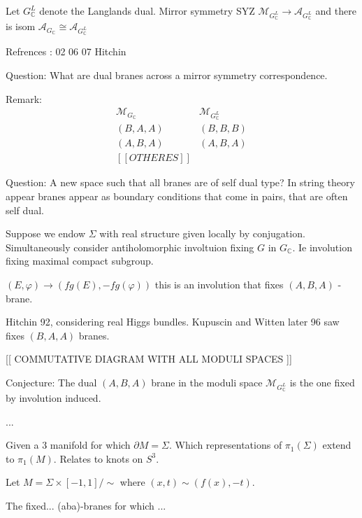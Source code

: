 Let $ G_\mathbb{C} ^L $ denote the Langlands dual. 
Mirror symmetry SYZ 
$\mathcal{M} _{G_\mathbb{C}  ^L } \rightarrow \mathcal{A} _{G_\mathbb{C}  ^L } $ 
and there is isom $\mathcal{A} _{G_\mathbb{C}  } \cong \mathcal{A} _{G_\mathbb{C}  ^L } $ 

Refrences : 
02 
06 
07 
Hitchin 

Question: 
What are dual branes across a mirror symmetry correspondence. 

Remark: 
\begin{align}
    \mathcal{M} _ {G_\mathbb{C} } & \mathcal{M} _ {G_\mathbb{C} ^L } \\
    (B, A, A) & (B,B,B) \\
    (A, B, A) & (A,B,A) \\
    [[ OTHERES ]] 
\end{align}

Question: A new space such that all branes are of self dual type?
In string theory appear branes appear as boundary conditions that come in pairs, 
that are often self dual. 

Suppose we endow $\Sigma $ with real structure given locally by conjugation.
Simultaneously consider antiholomorphic involtuion fixing $G$ in $G_\mathbb{C} $. 
Ie involution fixing maximal compact subgroup. 

$( E, \varphi) \rightarrow (fg(E), -fg(\varphi)) $ 
this is an involution that fixes $(A,B,A)$ -brane.

Hitchin 92, considering real Higgs bundles.
Kupuscin and Witten later 96 saw fixes $(B,A,A)$ branes. 


[[ COMMUTATIVE DIAGRAM WITH ALL MODULI SPACES  ]] 

Conjecture: 
The dual $(A,B,A)$ brane in the moduli space $ \mathcal{M}_{G_\mathbb{C}  ^L} $ 
is the one fixed by involution induced.

\begin{theorem}
...
\end{theorem}

Given a 3 manifold for which $ \partial M = \Sigma$. 
Which representations of $ \pi_1 ( \Sigma) $ extend to $ \pi_1 (M)$.
Relates to knots on $S^3$. 

Let $ M = \Sigma \times [-1, 1] /\sim  $ where $ (x,t) \sim (f(x) , -t) $. 

\begin{theorem}
    The fixed... (aba)-branes 
    for which ... 
\end{theorem}







 

